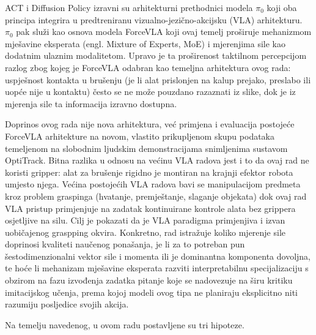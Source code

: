\documentclass[times, utf8, diplomski]{fer}
\begin{document}
ACT i Diffusion Policy izravni su arhitekturni prethodnici modela $\pi_0$ \cite{black2024pi0} koji oba principa integrira u predtreniranu vizualno-jezično-akcijsku (VLA) arhitekturu. $\pi_0$ pak služi kao osnova modela ForceVLA koji ovaj temelj proširuje mehanizmom mješavine eksperata (engl. Mixture of Experts, MoE) i mjerenjima sile kao dodatnim ulaznim modalitetom. Upravo je ta proširenost taktilnom percepcijom razlog zbog kojeg je ForceVLA odabran kao temeljna arhitektura ovog rada: uspješnost kontakta u brušenju (je li alat prislonjen na kalup prejako, preslabo ili uopće nije u kontaktu) često se ne može pouzdano razaznati iz slike, dok je iz mjerenja sile ta informacija izravno dostupna.

Doprinos ovog rada nije nova arhitektura, već primjena i evaluacija postojeće ForceVLA arhitekture na novom, vlastito prikupljenom skupu podataka temeljenom na slobodnim ljudskim demonstracijama snimljenima sustavom OptiTrack. Bitna razlika u odnosu na većinu VLA radova jest i to da ovaj rad ne koristi gripper: alat za brušenje rigidno je montiran na krajnji efektor robota umjesto njega. Većina postojećih VLA radova bavi se manipulacijom predmeta kroz problem graspinga (hvatanje, premještanje, slaganje objekata) dok ovaj rad VLA pristup primjenjuje na zadatak kontinuirane kontrole alata bez grippera osjetljive na silu. Cilj je pokazati da je VLA paradigma primjenjiva i izvan uobičajenog graspping okvira. Konkretno, rad istražuje koliko mjerenje sile doprinosi kvaliteti naučenog ponašanja, je li za to potreban pun šestodimenzionalni vektor sile i momenta ili je dominantna komponenta dovoljna, te hoće li mehanizam mješavine eksperata razviti interpretabilnu specijalizaciju s obzirom na fazu izvođenja zadatka pitanje koje se nadovezuje na širu kritiku imitacijskog učenja, prema kojoj modeli ovog tipa ne planiraju eksplicitno niti razumiju posljedice svojih akcija.

Na temelju navedenog, u ovom radu postavljene su tri hipoteze.
\end{document}
